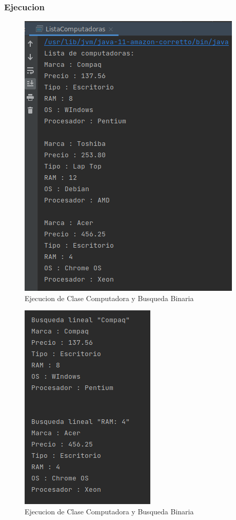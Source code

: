 \documentclass{article}
\begin{document}
			\subsubsection{Ejecucion}
			
				\begin{figure}[H]
					\centering
					\includegraphics[scale = 0.8]{images/e41.png}
					\caption{Ejecucion de Clase Computadora y Busqueda Binaria}
				\end{figure}
				
				\begin{figure}[H]
					\centering
					\includegraphics[scale = 0.8]{images/e42.png}
					\caption{Ejecucion de Clase Computadora y Busqueda Binaria}
				\end{figure}
				
\end{document}
